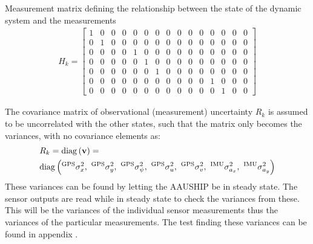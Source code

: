 Measurement matrix defining the relationship between the state of the dynamic system and the measurements
\begin{align}
H_k =
\begin{bmatrix}
1 & 0 & 0 & 0 & 0 & 0 & 0 & 0 & 0 & 0 & 0 & 0 & 0 & 0 & 0 \\
0 & 1 & 0 & 0 & 0 & 0 & 0 & 0 & 0 & 0 & 0 & 0 & 0 & 0 & 0 \\
0 & 0 & 0 & 0 & 1 & 0 & 0 & 0 & 0 & 0 & 0 & 0 & 0 & 0 & 0 \\
0 & 0 & 0 & 0 & 0 & 1 & 0 & 0 & 0 & 0 & 0 & 0 & 0 & 0 & 0 \\
0 & 0 & 0 & 0 & 0 & 0 & 1 & 0 & 0 & 0 & 0 & 0 & 0 & 0 & 0 \\
0 & 0 & 0 & 0 & 0 & 0 & 0 & 0 & 0 & 0 & 0 & 1 & 0 & 0 & 0 \\
0 & 0 & 0 & 0 & 0 & 0 & 0 & 0 & 0 & 0 & 0 & 0 & 1 & 0 & 0
\end{bmatrix}
\end{align}

The covariance matrix of observational (measurement) uncertainty $R_k$ is assumed to be uncorrelated with the other states, such that the matrix only becomes the variances, with no covariance elements as:
\begin{align}
&R_k = \diag{\mathbf{v}} =\\ \nonumber
&\diag{^\text{GPS}\sigma_{x}^2,\ ^\text{GPS}\sigma_{y}^2,\ ^\text{GPS}\sigma_{\psi}^2,\ ^\text{GPS}\sigma_{u}^2,\ ^\text{GPS}\sigma_{v}^2,\ ^\text{IMU}\sigma_{a_x}^2,\ ^\text{IMU}\sigma_{a_y}^2}
\end{align}
These variances can be found by letting the AAUSHIP be in steady state. The sensor outputs are read while in steady state to check the variances from these. This will be the variances of the individual sensor measurements thus the variances of the particular measurements. The test finding these variances can be found in appendix .

